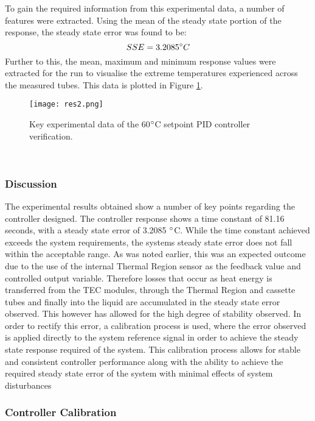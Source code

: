 To gain the required information from this experimental data, a number of features were extracted. Using the mean of the steady state portion of the response, the steady state error was found to be: 
$$ SSE = 3.2085\degree C$$
Further to this, the mean, maximum and minimum response values were extracted for the run to visualise the extreme temperatures experienced across the measured tubes. This data is plotted in Figure \ref{fig:res2}.

\begin{figure}[!htb]
	\centering
	\texttt{[image: res2.png]}
	\caption[Temperature Sensor Data Key Values - 60$\degree$C Setpoint.]{Key experimental data of the 60$\degree$C setpoint PID controller verification.}
	\label{fig:res2}
\end{figure} 
\FloatBarrier

\subsubsection{Discussion}

The experimental results obtained show a number of key points regarding the controller designed. The controller response shows a time constant of 81.16 seconds, with a steady state error of 3.2085 $\degree$C. While the time constant achieved exceeds the system requirements, the systems steady state error does not fall within the acceptable range. As was noted earlier, this was an expected outcome due to the use of the internal Thermal Region sensor as the feedback value and controlled output variable. Therefore losses that occur as heat energy is transferred from the TEC modules, through the Thermal Region and cassette tubes and finally into the liquid are accumulated in the steady state error observed. This however has allowed for the high degree of stability observed. In order to rectify this error, a calibration process is used, where the error observed is applied directly to the system reference signal in order to achieve the steady state response required of the system. This calibration process allows for stable and consistent controller performance along with the ability to achieve the required steady state error of the system with minimal effects of system disturbances 


\subsubsection{Controller Calibration}

